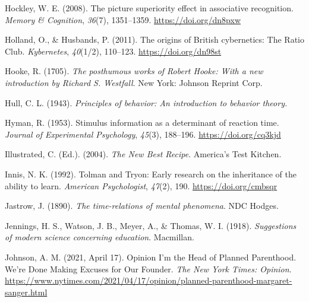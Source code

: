 \documentclass[
  oneside,
  12pt]{crumpbook}
\newlength{\cslhangindent}
\newlength{\cslentryspacingunit} %
\newenvironment{CSLReferences}[2] %
 {%
  \setlength{\parindent}{0pt}
  \ifodd #1
  \let\oldpar\par
  \def\par{\hangindent=\cslhangindent\oldpar}
  \fi
  \setlength{\parskip}{#2\cslentryspacingunit}
 }%
 {}
\begin{document}
\begin{CSLReferences}{1}{0}
\leavevmode{}%
Hockley, W. E. (2008). The picture superiority effect in associative recognition. \emph{Memory \& Cognition}, \emph{36}(7), 1351--1359. \url{https://doi.org/dn8pxw}

\leavevmode{}%
Holland, O., \& Husbands, P. (2011). The origins of {British} cybernetics: The {Ratio Club}. \emph{Kybernetes}, \emph{40}(1/2), 110--123. \url{https://doi.org/dn98st}

\leavevmode{}%
Hooke, R. (1705). \emph{The posthumous works of {Robert Hooke}: {With} a new introduction by {Richard S}. {Westfall}}. {New York: Johnson Reprint Corp}.

\leavevmode{}%
Hull, C. L. (1943). \emph{Principles of behavior: {An} introduction to behavior theory.}

\leavevmode{}%
Hyman, R. (1953). Stimulus information as a determinant of reaction time. \emph{Journal of Experimental Psychology}, \emph{45}(3), 188--196. \url{https://doi.org/cq3kjd}

\leavevmode{}%
Illustrated, C. (Ed.). (2004). \emph{The {New Best Recipe}}. {America's Test Kitchen}.

\leavevmode{}%
Innis, N. K. (1992). Tolman and {Tryon}: {Early} research on the inheritance of the ability to learn. \emph{American Psychologist}, \emph{47}(2), 190. \url{https://doi.org/cmbsqr}

\leavevmode{}%
Jastrow, J. (1890). \emph{The time-relations of mental phenomena}. {NDC Hodges}.

\leavevmode{}%
Jennings, H. S., Watson, J. B., Meyer, A., \& Thomas, W. I. (1918). \emph{Suggestions of modern science concerning education}. {Macmillan}.

\leavevmode{}%
Johnson, A. M. (2021, April 17). Opinion \textbar{} {I}'m the {Head} of {Planned Parenthood}. {We}'re {Done Making Excuses} for {Our Founder}. \emph{The New York Times: Opinion}. \url{https://www.nytimes.com/2021/04/17/opinion/planned-parenthood-margaret-sanger.html}


\end{CSLReferences}
\end{document}
